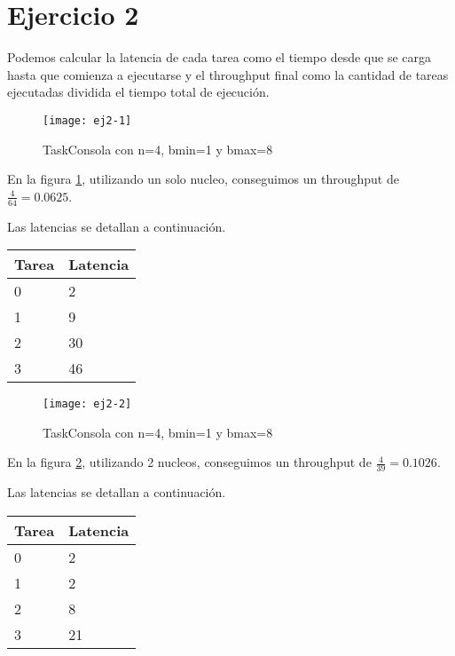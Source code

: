 \section{Ejercicio 2}

Podemos calcular la latencia de cada tarea como el tiempo desde que se carga hasta que comienza a ejecutarse y el throughput final como la cantidad de tareas ejecutadas dividida el tiempo total de ejecución.

\begin{figure}[H]
    \centering
    \texttt{[image: ej2-1]}
    \caption{TaskConsola con n=4, bmin=1 y bmax=8}
    \label{fig:ej2.1}
\end{figure}

En la figura \ref{fig:ej2.1}, utilizando un solo nucleo, conseguimos un throughput de $\frac{4}{64} = 0.0625$.

Las latencias se detallan a continuación.

\begin{center}
    \begin{tabular}{| l | l |}
        \hline
        Tarea & Latencia \\ \hline
        0 & 2 \\
        1 & 9 \\
        2 & 30 \\
        3 & 46 \\
        \hline
    \end{tabular}
\end{center}

\begin{figure}[H]
    \centering
    \texttt{[image: ej2-2]}
    \caption{TaskConsola con n=4, bmin=1 y bmax=8}
    \label{fig:ej2.2}
\end{figure}

En la figura \ref{fig:ej2.2}, utilizando 2 nucleos, conseguimos un throughput de $\frac{4}{39} = 0.1026$.

Las latencias se detallan a continuación.

\begin{center}
    \begin{tabular}{| l | l |}
        \hline
        Tarea & Latencia \\ \hline
        0 & 2 \\
        1 & 2 \\
        2 & 8 \\
        3 & 21 \\
        \hline
    \end{tabular}
\end{center}

